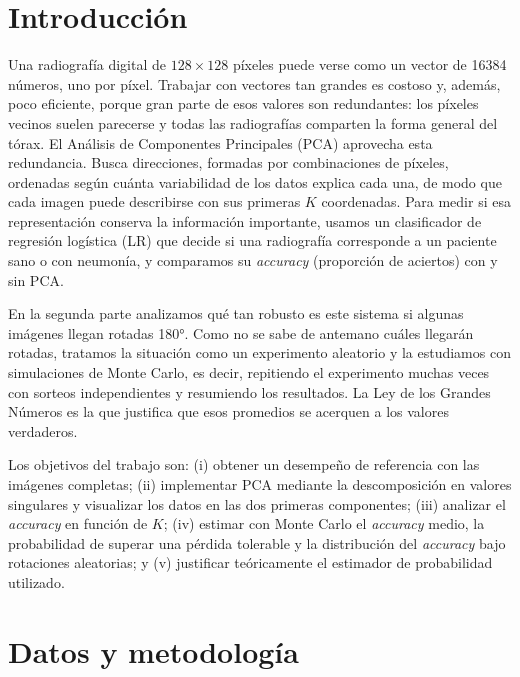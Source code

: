 \documentclass[11pt,a4paper]{article}
\newcommand{\acc}{\emph{accuracy}}
\begin{document}
\section{Introducción}
Una radiografía digital de $128\times128$ píxeles puede verse como un vector de 16384 números, uno por
píxel. Trabajar con vectores tan grandes es costoso y, además, poco eficiente, porque gran parte de esos
valores son redundantes: los píxeles vecinos suelen parecerse y todas las radiografías comparten la forma
general del tórax. El Análisis de Componentes Principales (PCA) aprovecha esta redundancia. Busca
direcciones, formadas por combinaciones de píxeles, ordenadas según cuánta variabilidad de los datos
explica cada una, de modo que cada imagen puede describirse con sus primeras $K$ coordenadas. Para medir si
esa representación conserva la información importante, usamos un clasificador de regresión logística (LR)
que decide si una radiografía corresponde a un paciente sano o con neumonía, y comparamos su \acc{}
(proporción de aciertos) con y sin PCA.

En la segunda parte analizamos qué tan robusto es este sistema si algunas imágenes llegan rotadas 180°.
Como no se sabe de antemano cuáles llegarán rotadas, tratamos la situación como un experimento aleatorio y
la estudiamos con simulaciones de Monte Carlo, es decir, repitiendo el experimento muchas veces con sorteos
independientes y resumiendo los resultados. La Ley de los Grandes Números es la que justifica que esos
promedios se acerquen a los valores verdaderos.

Los objetivos del trabajo son: (i) obtener un desempeño de referencia con las imágenes completas;
(ii) implementar PCA mediante la descomposición en valores singulares y visualizar los datos en las dos
primeras componentes; (iii) analizar el \acc{} en función de $K$; (iv) estimar con Monte Carlo el \acc{}
medio, la probabilidad de superar una pérdida tolerable y la distribución del \acc{} bajo rotaciones
aleatorias; y (v) justificar teóricamente el estimador de probabilidad utilizado.

\section{Datos y metodología}
\end{document}
